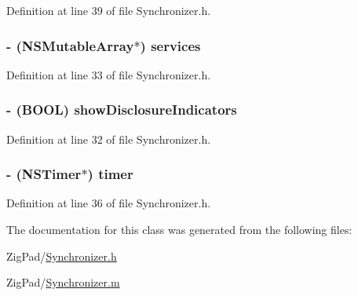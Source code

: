 Definition at line 39 of file Synchronizer.h.

\hypertarget{interface_synchronizer_a7f90b977eaa3f12507bc0a97480c4e78}{
\subsubsection[{services}]{\setlength{\rightskip}{0pt plus 5cm}-\/ (NSMutableArray$\ast$) services}}
\label{interface_synchronizer_a7f90b977eaa3f12507bc0a97480c4e78}


Definition at line 33 of file Synchronizer.h.

\hypertarget{interface_synchronizer_a203153a42b054a34a39087fee7eeab93}{
\subsubsection[{showDisclosureIndicators}]{\setlength{\rightskip}{0pt plus 5cm}-\/ (BOOL) showDisclosureIndicators}}
\label{interface_synchronizer_a203153a42b054a34a39087fee7eeab93}


Definition at line 32 of file Synchronizer.h.

\hypertarget{interface_synchronizer_a49efd1a3e05e38497c176a4e11fdbaab}{
\subsubsection[{timer}]{\setlength{\rightskip}{0pt plus 5cm}-\/ (NSTimer$\ast$) timer}}
\label{interface_synchronizer_a49efd1a3e05e38497c176a4e11fdbaab}


Definition at line 36 of file Synchronizer.h.



The documentation for this class was generated from the following files:\begin{DoxyCompactItemize}
\item 
ZigPad/\hyperlink{_synchronizer_8h}{Synchronizer.h}\item 
ZigPad/\hyperlink{_synchronizer_8m}{Synchronizer.m}\end{DoxyCompactItemize}

